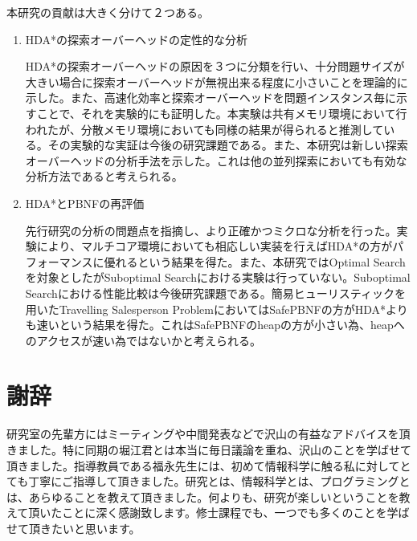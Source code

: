 \documentclass[uplatex]{jsarticle}
\begin{document}
本研究の貢献は大きく分けて２つある。

\begin{enumerate}
\item HDA*の探索オーバーヘッドの定性的な分析

HDA*の探索オーバーヘッドの原因を３つに分類を行い、十分問題サイズが大きい場合に探索オーバーヘッドが無視出来る程度に小さいことを理論的に示した。また、高速化効率と探索オーバーヘッドを問題インスタンス毎に示すことで、それを実験的にも証明した。本実験は共有メモリ環境において行われたが、分散メモリ環境においても同様の結果が得られると推測している。その実験的な実証は今後の研究課題である。また、本研究は新しい探索オーバーヘッドの分析手法を示した。これは他の並列探索においても有効な分析方法であると考えられる。
\newline

\item HDA*とPBNFの再評価

先行研究の分析の問題点を指摘し、より正確かつミクロな分析を行った。実験により、マルチコア環境においても相応しい実装を行えばHDA*の方がパフォーマンスに優れるという結果を得た。また、本研究ではOptimal Searchを対象としたがSuboptimal Searchにおける実験は行っていない。Suboptimal Searchにおける性能比較は今後研究課題である。簡易ヒューリスティックを用いたTravelling Salesperson ProblemにおいてはSafePBNFの方がHDA*よりも速いという結果を得た。これはSafePBNFのheapの方が小さい為、heapへのアクセスが速い為ではないかと考えられる。


\end{enumerate}

\newpage
\section{謝辞}

研究室の先輩方にはミーティングや中間発表などで沢山の有益なアドバイスを頂きました。特に同期の堀江君とは本当に毎日議論を重ね、沢山のことを学ばせて頂きました。指導教員である福永先生には、初めて情報科学に触る私に対してとても丁寧にご指導して頂きました。研究とは、情報科学とは、プログラミングとは、あらゆることを教えて頂きました。何よりも、研究が楽しいということを教えて頂いたことに深く感謝致します。修士課程でも、一つでも多くのことを学ばせて頂きたいと思います。

\newpage




\newpage

\printindex
\end{document}
